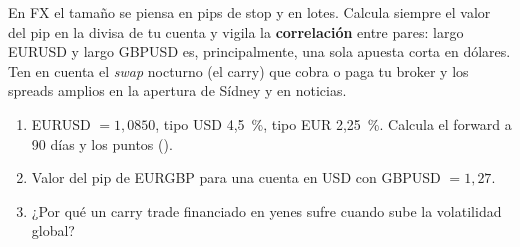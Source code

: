 \begin{practica}
En FX el tamaño se piensa en pips de stop y en lotes. Calcula siempre el valor del pip en la divisa de
tu cuenta y vigila la \textbf{correlación} entre pares: largo EURUSD y largo GBPUSD es,
principalmente, una sola apuesta corta en dólares. Ten en cuenta el \emph{swap} nocturno (el carry) que
cobra o paga tu broker y los spreads amplios en la apertura de Sídney y en noticias.
\end{practica}

\begin{ejercicios}
\begin{enumerate}
\item EURUSD $=1{,}0850$, tipo USD 4,5~\%, tipo EUR 2,25~\%. Calcula el forward a 90 días y los puntos
  ().
\item Valor del pip de EURGBP para una cuenta en USD con GBPUSD $=1{,}27$.
\item ¿Por qué un carry trade financiado en yenes sufre cuando sube la volatilidad global?
\end{enumerate}
\end{ejercicios}

